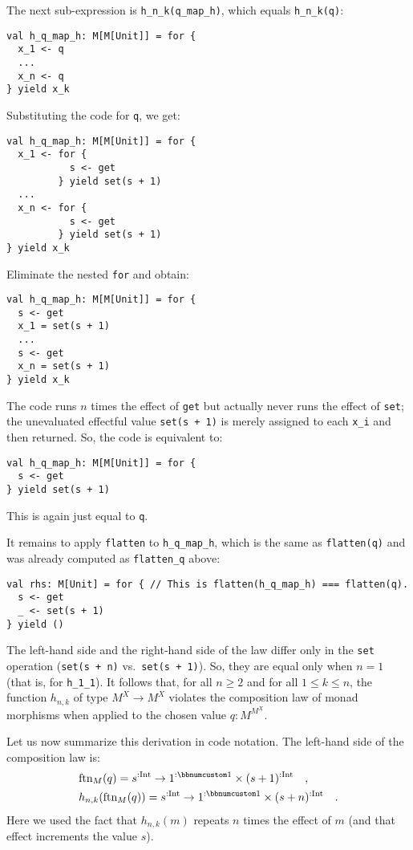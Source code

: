 The next sub-expression is \lstinline!h_n_k(q_map_h)!, which equals
\lstinline!h_n_k(q)!:
\begin{lstlisting}
val h_q_map_h: M[M[Unit]] = for {
  x_1 <- q
  ...
  x_n <- q
} yield x_k
\end{lstlisting}
Substituting the code for \lstinline!q!, we get:
\begin{lstlisting}
val h_q_map_h: M[M[Unit]] = for {
  x_1 <- for {
           s <- get
         } yield set(s + 1)
  ...
  x_n <- for {
           s <- get
         } yield set(s + 1)
} yield x_k
\end{lstlisting}
Eliminate the nested \lstinline!for! and obtain:
\begin{lstlisting}
val h_q_map_h: M[M[Unit]] = for {
  s <- get
  x_1 = set(s + 1)
  ...
  s <- get
  x_n = set(s + 1)
} yield x_k
\end{lstlisting}
The code runs $n$ times the effect of \lstinline!get! but actually
never runs the effect of \lstinline!set!; the unevaluated effectful
value \lstinline!set(s + 1)! is merely assigned to each \lstinline!x_i!
and then returned. So, the code is equivalent to:
\begin{lstlisting}
val h_q_map_h: M[M[Unit]] = for {
  s <- get
} yield set(s + 1)
\end{lstlisting}
This is again just equal to \lstinline!q!.

It remains to apply \lstinline!flatten! to \lstinline!h_q_map_h!,
which is the same as \lstinline!flatten(q)! and was already computed
as \lstinline!flatten_q! above:
\begin{lstlisting}
val rhs: M[Unit] = for { // This is flatten(h_q_map_h) === flatten(q).
  s <- get
  _ <- set(s + 1)
} yield ()
\end{lstlisting}

The left-hand side and the right-hand side of the law differ only
in the \lstinline!set! operation (\lstinline!set(s + n)! vs.~\lstinline!set(s + 1)!).
So, they are equal only when $n=1$ (that is, for \lstinline!h_1_1!).
It follows that, for all $n\ge2$ and for all $1\le k\le n$, the
function $h_{n,k}$ of type $M^{X}\rightarrow M^{X}$ violates the
composition law of monad morphisms when applied to the chosen value
$q:M^{M^{X}}$.

Let us now summarize this derivation in code notation. The left-hand
side of the composition law is: 
\begin{align*}
 & \text{ftn}_{M}(q)=s^{:\text{Int}}\rightarrow1^{:\bbnum 1}\times(s+1)^{:\text{Int}}\quad,\\
 & h_{n,k}(\text{ftn}_{M}(q))=s^{:\text{Int}}\rightarrow1^{:\bbnum 1}\times(s+n)^{:\text{Int}}\quad.
\end{align*}
Here we used the fact that $h_{n,k}(m)$ repeats $n$ times the effect
of $m$ (and that effect increments the value $s$). 

